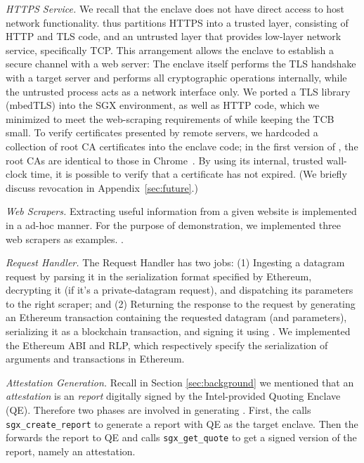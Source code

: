 \noindent\emph{HTTPS Service.} We recall that the enclave does not have direct
access to host network functionality. \tc thus partitions HTTPS into a trusted
layer, consisting of HTTP and TLS code, and an untrusted layer that provides
low-layer network service, specifically TCP.  This arrangement allows the
enclave to establish a secure channel with a web server: The enclave itself
performs the TLS handshake with a target server and performs all cryptographic
operations internally, while the untrusted process acts as a network interface
only. We ported a TLS library (mbedTLS) into the SGX environment, as well as
HTTP code, which we minimized to meet the web-scraping requirements of \tc while
keeping the TCB small. To verify certificates presented by remote servers, we
hardcoded a collection of root CA certificates into the enclave code; in the
first version of \tc, the root CAs are identical to those in Chrome~\cite{}. By using its internal, trusted wall-clock time, it is possible to verify that a certificate has not expired. (We briefly discuss revocation in Appendix~\ref{sec:future}.)

\vspace{2mm}

\noindent\emph{Web Scrapers.} Extracting useful information from a given website
is implemented in a ad-hoc manner. For the purpose of demonstration, we
implemented three web scrapers as examples. .

\vspace{2mm}

\noindent\emph{Request Handler.} The Request Handler has two jobs: (1) Ingesting
a datagram request by parsing it in the serialization format specified by
Ethereum, decrypting it (if it's a private-datagram request), and dispatching
its parameters to the right scraper; and (2) Returning the response to the
request by generating an Ethereum transaction containing the requested datagram
(and parameters), serializing it as a blockchain transaction, and signing it
using \skTC. We implemented the Ethereum ABI and RLP, which respectively specify
the serialization of arguments and transactions in Ethereum. 

\vspace{2mm}

\noindent\emph{Attestation Generation.} Recall in Section \ref{sec:background}
we mentioned that an \emph{attestation} is an \emph{report} digitally signed by
the Intel-provided Quoting Enclave (QE).  Therefore two phases are involved in
generating \att. First, the \encname calls \texttt{sgx\_create\_report} to
generate a report with QE as the target enclave. Then the \medname forwards the
report to QE and calls \texttt{sgx\_get\_quote} to get a signed version of the
report, namely an attestation.

